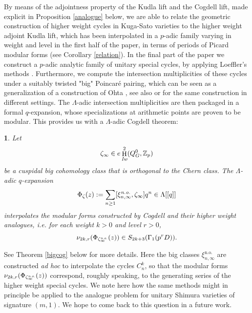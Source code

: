 \documentclass[12pt,a4paper,reqno]{amsart}
\theoremstyle{definition}
\numberwithin{definition}{subsection}
\theoremstyle{definition}
\numberwithin{Definition}{subsection}
\theoremstyle{remark}
\theoremstyle{remark}
\numberwithin{Remark}{subsection}
\theoremstyle{remark}
\theoremstyle{plain}
\numberwithin{Theorem}{subsection}
\theoremstyle{plain}
\newcommand{\thistheoremname}{}
\newtheorem*{genericthm}{\thistheoremname}
\newenvironment{namedthm}[1]
  {\renewcommand{\thistheoremname}{#1}%
   \begin{genericthm}}
  {\end{genericthm}}
\theoremstyle{plain}
\theoremstyle{plain}
\theoremstyle{plain}
\theoremstyle{plain}
\theoremstyle{plain}
\theoremstyle{plain}
\newcommand*{\Z}{\mathbb{Z}}
\DeclareMathOperator{\h}{H}
\begin{document}
By means of the adjointness property of the Kudla lift and the Cogdell lift, made explicit in Proposition \ref{analogue} below, we are able to relate the geometric construction of higher weight cycles in Kuga-Sato varieties to the higher weight adjoint Kudla lift, which has been interpolated in a $p$-adic family varying in weight and level in the first half of the paper, in terms of periods of Picard modular forms (see Corollary \ref{relation}). 
In the final part of the paper we construct a $p$-adic analytic family of unitary special cycles, by applying Loeffler's methods \cite{loeffler}. Furthermore, we compute the intersection multiplicities of these cycles under a suitably twisted "big" Poincaré pairing, which can be seen as a generalization of a construction of Ohta \cite[Proposition 4.1.13]{ohta}, see also \cite[Proposition 7.13]{fornea} or \cite[Lemma 1.1]{darmon} for the same construction in different settings. The $\Lambda$-adic intersection multiplicities are then packaged in a formal $q$-expansion, whose specializations at arithmetic points are proven to be modular. This provides us with a $\Lambda$-adic Cogdell theorem:
\begin{namedthm}{Main Theorem C}
Let $$\zeta_\infty\in e\h_{\emph{Iw}}^2(Q^0_G,\Z_p)$$ be a cuspidal big cohomology class that is orthogonal to the Chern class. The $\Lambda$-adic $q$-expansion
\[
\Phi_{\zeta}(z):=\sum_{n\geq 1}[\xi_{n,\infty}^{\emph{n.o.}}, \zeta_\infty] q^n\in \Lambda[[q]]
\]
interpolates the modular forms constructed by Cogdell and their higher weight analogues, i.e. for each weight $k> 0$ and level $r> 0$, 
\[
\nu_{2k,r}(\Phi_{\zeta_\infty^{\emph{n.o.}}}(z))\in S_{2k+3}(\Gamma_1(p^rD)).
\]
\end{namedthm}
See Theorem \ref{bigcog} below for more details.
Here the big classes $\xi_{n,\infty}^{\text{n.o.}}$ are constructed \textit{ad hoc} to interpolate the cycles $C_n^k$, so that the modular forms $\nu_{2k,r}(\Phi_{\zeta_\infty^{\emph{n.o.}}}(z))$ correspond, roughly speaking, to the generating series of the higher weight special cycles. We note here how the same methods might in principle be applied to the analogue problem for unitary Shimura varieties of signature $(m,1)$. We hope to come back to this question in a future work.

\end{document}
